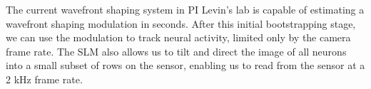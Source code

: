 

 
The current wavefront shaping system in PI Levin's lab is capable of estimating a wavefront shaping modulation in seconds. After this initial bootstrapping stage, we can use the modulation to track neural activity, limited only by the camera frame rate. The SLM also allows us to tilt and direct the image of all neurons into a small subset of rows on the sensor, enabling us to read from the sensor at a 2 kHz frame rate.

